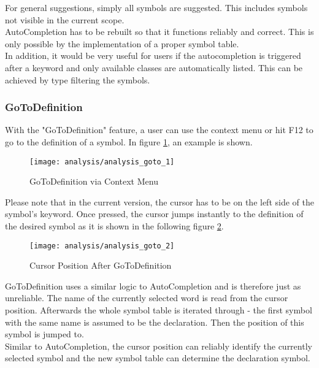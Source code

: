 For general suggestions, simply all symbols are suggested.
This includes symbols not visible in the current scope. \\

AutoCompletion has to be rebuilt so that it functions reliably and correct.
This is only possible by the implementation of a proper symbol table.\\

In addition, it would be very useful for users if the autocompletion is triggered after a 
keyword and only available classes are automatically listed. This can be achieved by type filtering the symbols.

\subsubsection{GoToDefinition}
With the "GoToDefinition" feature, a user can use the context menu or hit F12 to go to the definition of a symbol.
In figure \ref{fig:analysis_goto_1}, an example is shown.

\begin{figure}[H]
    \centering
    \texttt{[image: analysis/analysis\_goto\_1]}
    \caption{GoToDefinition via Context Menu}
    \label{fig:analysis_goto_1}
\end{figure}

Please note that in the current version, the cursor has to be on the left side of the symbol's keyword.
Once pressed, the cursor jumps instantly to the definition of the desired symbol as it is shown in the following figure \ref{fig:analysis_goto_2}.

\begin{figure}[H]
    \centering
    \texttt{[image: analysis/analysis\_goto\_2]}
    \caption{Cursor Position After GoToDefinition}
    \label{fig:analysis_goto_2}
\end{figure}

GoToDefinition uses a similar logic to AutoCompletion and is therefore just as unreliable.
The name of the currently selected word is read from the cursor position.
Afterwards the whole symbol table is iterated through - the first symbol with the same name is assumed to be the declaration.
Then the position of this symbol is jumped to. \\

Similar to AutoCompletion, the cursor position can reliably identify the currently selected symbol and the new symbol table can determine the declaration symbol.

